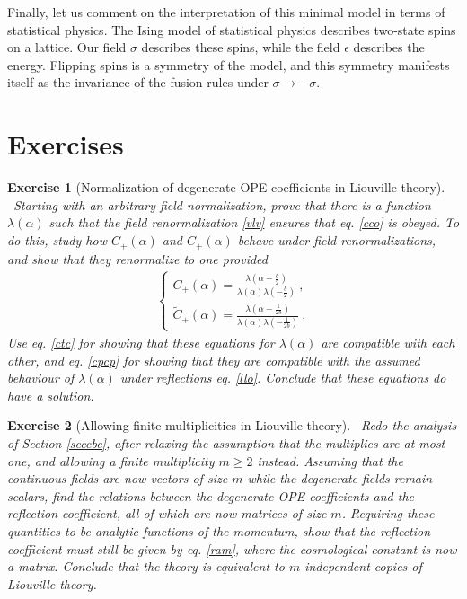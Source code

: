 \documentclass[12pt, a4paper, notitlepage, twoside]{report}
\numberwithin{equation}{section}
\theoremstyle{break}
\newtheorem{exo}{Exercise}[chapter]
\begin{document}
Finally, let us comment on the interpretation of this minimal model in terms of statistical physics.
The Ising model of statistical physics describes two-state spins on a lattice.
Our field $\sigma$ describes these spins, while the field $\epsilon$ describes the energy.
Flipping spins is a symmetry of the model, and this symmetry manifests itself as the invariance of the fusion rules under $\sigma\to -\sigma$. 

\section{Exercises}

\begin{exo}[Normalization of degenerate OPE coefficients in Liouville theory]
 ~\label{exonorm}
Starting with an arbitrary field normalization, prove that there is a function $\lambda(\alpha)$ such that the field renormalization \eqref{vlv} ensures that eq. \eqref{cco} is obeyed.
To do this, study how $C_+(\alpha)$ and $\tilde{C}_+(\alpha)$ behave under field renormalizations, and show that they renormalize to one provided
\begin{align}
\left\{\begin{array}{l} 
 C_+(\alpha) = \frac{\lambda(\alpha-\frac{b}{2})}{\lambda(\alpha)\lambda(-\frac{b}{2})} \ ,
\\
\tilde{C}_+(\alpha) = \frac{\lambda(\alpha-\frac{1}{2b})}{\lambda(\alpha)\lambda(-\frac{1}{2b})} \ .
\end{array}\right. 
\end{align}
Use eq. \eqref{ctc} for showing that these equations for $\lambda(\alpha)$ are compatible with each other, and eq. \eqref{cpcp} for showing that they are compatible with the  assumed behaviour of $\lambda(\alpha)$ under reflections eq. \eqref{llo}.
Conclude that these equations do have a solution.
\end{exo}

\begin{exo}[Allowing finite multiplicities in Liouville theory]
 ~\label{exomul}
Redo the analysis of Section \ref{seccbe}, after relaxing the assumption that the multiplies are at most one, and allowing a finite multiplicity $m\geq 2$ instead. 
Assuming that the continuous fields are now vectors of size $m$ while the degenerate fields remain scalars, find the relations between the degenerate OPE coefficients and the reflection coefficient, all of which are now matrices of size $m$. 
Requiring these quantities to be analytic functions of the momentum, show that the reflection coefficient must still be given by eq. \eqref{ram}, where the cosmological constant is now a matrix. 
Conclude that the theory is equivalent to $m$ independent copies of Liouville theory. 
\end{exo}
\end{document}
